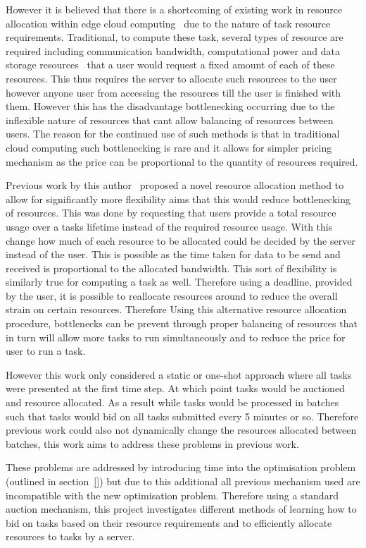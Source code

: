 However it is believed that there is a shortcoming of existing work in resource allocation within
edge cloud computing~\citep{vaji_infocom, Bi2019} due to the nature of task resource requirements. Traditional, to
compute these task, several types of resource are required including communication bandwidth, computational power and
data storage resources~\cite{vaji_infocom} that a user would request a fixed amount of each of these resources.
This thus requires the server to allocate such resources to the user however anyone user from accessing the resources
till the user is finished with them. However this has the disadvantage bottlenecking occurring due to the inflexible
nature of resources that cant allow balancing of resources between users. The reason for the continued use of such
methods is that in traditional cloud computing such bottlenecking is rare and it allows for simpler pricing mechanism
as the price can be proportional to the quantity of resources required.

Previous work by this author~\citep{FlexibleResourceAllocation} proposed a novel resource allocation method to allow
for significantly more flexibility aims that this would reduce bottlenecking of resources. This was done by requesting
that users provide a total resource usage over a tasks lifetime instead of the required resource usage. With this
change how much of each resource to be allocated could be decided by the server instead of the user. This is possible
as the time taken for data to be send and received is proportional to the allocated bandwidth. This sort of flexibility
is similarly true for computing a task as well. Therefore using a deadline, provided by the user, it is possible
to reallocate resources around to reduce the overall strain on certain resources. Therefore Using this alternative
resource allocation procedure, bottlenecks can be prevent through proper balancing of resources that in turn will allow
more tasks to run simultaneously and to reduce the price for user to run a task.

However this work only considered a static or one-shot approach where all tasks were presented at the first time step.
At which point tasks would be auctioned and resource allocated. As a result while tasks would be processed in batches
such that tasks would bid on all tasks submitted every 5 minutes or so. Therefore previous work could also not
dynamically change the resources allocated between batches, this work aims to address these problems in previous work.

These problems are addressed by introducing time into the optimisation problem (outlined in section~\ref{}) but due
to this additional all previous mechanism used are incompatible with the new optimisation problem. Therefore using
a standard auction mechanism, this project investigates different methods of learning how to bid on tasks
based on their resource requirements and to efficiently allocate resources to tasks by a server.

